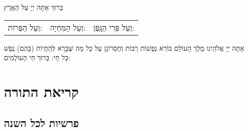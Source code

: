 \documentclass[twoside, openany, parskip=half, 11pt]{book}
\begin{document}
בָּרוּךְ אַתָּה יְיָ עַל הָאָֽרֶץ 

\begin{tabular}{c|c|c}
וְעַל הַפֵּרוֹת: & וְעַל הַמִּחְיָה: & וְעַל פְּרִי הַגָּֽפֶן:
\end{tabular}
\medskip

\sepline

\vspace{\baselineskip}

  אַתָּה יְיָ אֱלֹהֵֽינוּ מֶֽלֶךְ הָעוֹלָם בּוֹרֵא נְפָשׁוֹת רַבּוֹת וְחֶסְרוֹנָן 
עַל כָּל מַה שֶּׁבָּרָא לְהַחֲיוֹת (בָּהֶם) נֶֽפֶשׁ כָּל חָי: בָּרוּךְ חַי הָעוֹלָמִים:

\chapter[קריאת התורה]{ קריאת התורה }
\label{torah}

\section{פרשיות לכל השנה}
\end{document}

